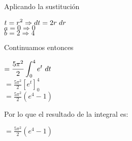 \vspace{15 pt}
Aplicando la sustitución 
\begin{center}
    $\displaystyle t = r^2 \Rightarrow dt = 2r \hspace{3 pt} dr$\\
    $\displaystyle a = 0 \Rightarrow 0$\\
    $\displaystyle b  = 2 \Rightarrow 4$
\end{center}
\vspace{15 pt}
Continuamos entonces  \begin{center}
    $\displaystyle = \frac{5\pi^2}{2} \int_0^4 e^t \hspace{3 pt} dt$\\
    \vspace{10 pt}
    $\displaystyle = \frac{5\pi^2}{2} [e^t]^4_0$\\
    \vspace{10 pt}
    $\displaystyle = \frac{5\pi^2}{2} (e^4 - 1)$
\end{center}
\vspace{15 pt}
Por lo que el resultado de la integral es: 
\begin{center}
    $\boxed{= \frac{5\pi^2}{2} (e^4 - 1)}$
\end{center}
